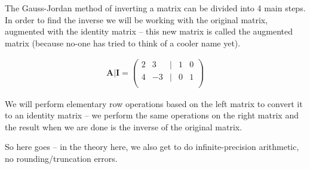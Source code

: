 The Gauss-Jordan method of inverting a matrix can be divided into 4 main steps.  
In order to find the inverse we will be working with the original matrix, augmented with the identity matrix -- this new matrix is called the augmented matrix (because no-one has tried to think of a cooler name yet).  

\begin{gather}
\mathbf{A} | \mathbf{I} =
\begin{pmatrix}
2 & 3 & | & 1 & 0 \\
4 & -3 & | & 0 & 1 \\
\end{pmatrix}
\end{gather}

We will perform elementary row operations based on the left matrix to convert it to an identity matrix -- we perform the same operations on the right matrix and the result when we are done is the inverse of the original matrix.

So here goes -- in the theory here, we also get to do infinite-precision arithmetic, no rounding/truncation errors.  


